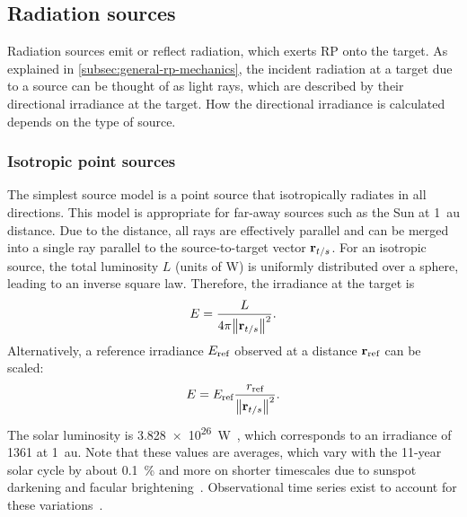 \subsection{Radiation sources}
\label{subsec:radiation-sources}

Radiation sources emit or reflect radiation, which exerts \gls{RP} onto the target. As explained in \cref{subsec:general-rp-mechanics}, the incident radiation at a target due to a source can be thought of as light rays, which are described by their directional irradiance at the target. How the directional irradiance is calculated depends on the type of source.

\subsubsection{Isotropic point sources}
The simplest source model is a point source that isotropically radiates in all directions. This model is appropriate for far-away sources such as the Sun at \qty{1}{\astronomicalunit} distance. Due to the distance, all rays are effectively parallel and can be merged into a single ray parallel to the source-to-target vector $\vb r_{t/s}$. For an isotropic source, the total luminosity $L$ (units of \unit{\W}) is uniformly distributed over a sphere, leading to an inverse square law. Therefore, the irradiance at the target is
\begin{align}
    \label{eq:irradiance-point-luminosity}
    E = \frac{L}{4\pi\norm{\vb r_{t/s}}^2}.
\end{align}
Alternatively, a reference irradiance $E_\textnormal{ref}$ observed at a distance $\vb r_\textnormal{ref}$ can be scaled:
\begin{align}
    E = E_\textnormal{ref} \frac{r_\textnormal{ref}}{\norm{\vb r_{t/s}}^2}.
\end{align}
The solar luminosity is \qty{3.828e26}{\W}~\cite{Prsa2016}, which corresponds to an irradiance of \qty{1361}{\irr} at \qty{1}{\astronomicalunit}. Note that these values are averages, which vary with the 11-year solar cycle by about \qty{0.1}{\percent} and more on shorter timescales due to sunspot darkening and facular brightening~\cite{Kopp2016}. Observational time series exist to account for these variations~\cite{Dewitte2017}.

